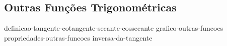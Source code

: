 \subsection{Outras Funções Trigonométricas}

{definicao-tangente-cotangente-secante-cossecante}
{grafico-outras-funcoes}
{propriedades-outras-funcoes}
{inversa-da-tangente}